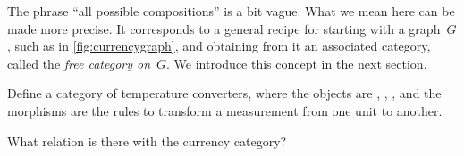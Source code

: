 The phrase ``all possible compositions'' is a bit vague. What we mean here can be made more precise. It corresponds to a general recipe for starting with a graph~$G$, such as in \cref{fig:currencygraph}, and obtaining from it an associated category, called the \emph{free category on}~$G$. We introduce this concept in the next section.


\begin{exercise}[Temperatures]
    Define a category of temperature converters, where the objects are
    , , , and the
    morphisms are the rules to transform a measurement from one unit to another.

    What relation is there with the currency category?

\end{exercise}



